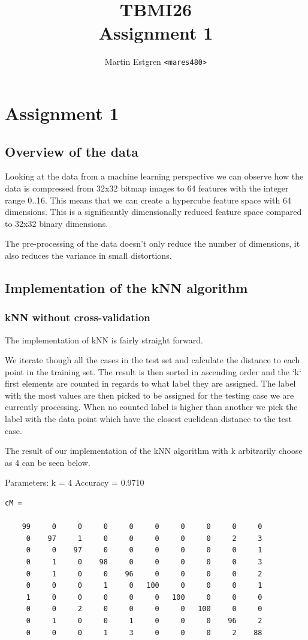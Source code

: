 \documentclass[a4paper,12pt]{article}
\title{TBMI26  \\
       Assignment 1}
\author{Martin Estgren \texttt{<mares480>}}
\begin{document}
    \maketitle %
\section{Assignment 1}

\subsection{Overview of the data}

  
Looking at the data from a machine learning perspective we can observe how the data is compressed from 32x32 bitmap images to 64 features with the integer range 0..16. This means that we can create a hypercube feature space with 64 dimensions. This is a significantly dimensionally reduced feature space compared to 32x32 binary dimensions.

The pre-processing of the data doesn't only reduce the number of dimensions, it also reduces the variance in small distortions.

\subsection{Implementation of the kNN algorithm}

\subsubsection{kNN without cross-validation}
The implementation of kNN is fairly straight forward. 

We iterate though all the cases in the test set and calculate the distance to each point in the training set. The result is then sorted in ascending order and the `k` first elements are counted in regards to what label they are assigned. The label with the most values are then picked to be assigned for the testing case we are currently processing. When no counted label is higher than another we pick the label with the data point which have the closest euclidean distance to the test case.

The result of our implementation of the kNN algorithm with k arbitrarily choose as 4 can be seen below.

Parameters: k = 4
Accuracy = 0.9710

\begin{verbatim}
cM =

    99     0     0     0     0     0     0     0     0     0
     0    97     1     0     0     0     0     0     2     3
     0     0    97     0     0     0     0     0     0     1
     0     1     0    98     0     0     0     0     0     3
     0     1     0     0    96     0     0     0     0     2
     0     0     0     1     0   100     0     0     0     1
     1     0     0     0     0     0   100     0     0     0
     0     0     2     0     0     0     0   100     0     0
     0     1     0     0     1     0     0     0    96     2
     0     0     0     1     3     0     0     0     2    88
\end{verbatim}
\end{document}
